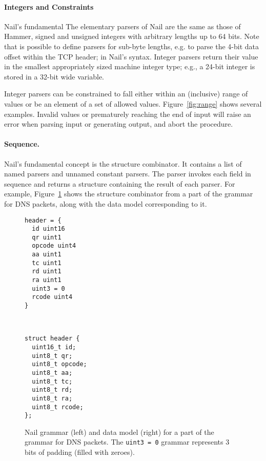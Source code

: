 \paragraph{Integers and Constraints}
Nail's fundamental 
The elementary parsers of Nail are the same as those of Hammer, signed
and unsigned integers with arbitrary lengths up to 64 bits.  Note that is
possible to define parsers for sub-byte lengths, e.g. to parse the 4-bit
data offset within the TCP header; in Nail's syntax.  Integer parsers
return their value in the smallest appropriately sized machine integer
type; e.g., a 24-bit integer is stored in a 32-bit wide variable.

Integer parsers can be constrained to fall either within an (inclusive)
range of values or be an element of a set of allowed values.
Figure~\ref{fig:range} shows several examples.
Invalid values or prematurely reaching the end of input will raise an
error when parsing input or generating output, and abort the procedure.


\paragraph{Sequence.}

Nail's fundamental concept is the structure combinator. It contains a list of
named parsers and unnamed constant parsers. The parser invokes each field 
in sequence and returns a structure containing the result of each parser.
For example, Figure~\ref{fig:dns-struct} shows the structure combinator
from a part of the grammar for DNS packets, along with the data model
corresponding to it.

\begin{figure}[tb]

\begin{minipage}{0.45\columnwidth}
\begin{verbatim}
header = {
  id uint16
  qr uint1
  opcode uint4
  aa uint1 
  tc uint1
  rd uint1
  ra uint1
  uint3 = 0
  rcode uint4
}
\end{verbatim} 
\end{minipage}
~
\begin{minipage}{0.45\columnwidth}
\begin{verbatim}
struct header {
  uint16_t id;
  uint8_t qr;
  uint8_t opcode;
  uint8_t aa;
  uint8_t tc;
  uint8_t rd;
  uint8_t ra;
  uint8_t rcode;
};
\end{verbatim} 
\end{minipage}

\caption{Nail grammar (left) and data model (right) for a part of the
grammar for DNS packets.  The \texttt{uint3 = 0} grammar represents
3 bits of padding (filled with zeroes).}
\label{fig:dns-struct}
\end{figure}


